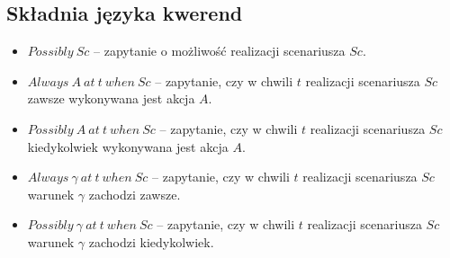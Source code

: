 \documentclass{article}
\begin{document}
\subsection{Składnia języka kwerend}
\begin{itemize}
    \item $Possibly\ Sc$ – zapytanie o możliwość realizacji scenariusza $Sc$.
    \item $Always\ A\ at\ t\ when\ Sc$ – zapytanie, czy w chwili $t$ realizacji scenariusza $Sc$ zawsze wykonywana jest akcja $A$.
    \item $Possibly\ A\ at\ t\ when\ Sc$ – zapytanie, czy w chwili $t$ realizacji scenariusza $Sc$ kiedykolwiek wykonywana jest akcja $A$.
    \item $Always\ \gamma\ at\ t\ when\ Sc$ – zapytanie, czy w chwili $t$ realizacji scenariusza $Sc$ warunek $\gamma$ zachodzi zawsze.
    \item $Possibly\ \gamma\ at\ t\ when\ Sc$ – zapytanie, czy w chwili $t$ realizacji scenariusza $Sc$ warunek $\gamma$ zachodzi kiedykolwiek.
\end{itemize}
\end{document}
